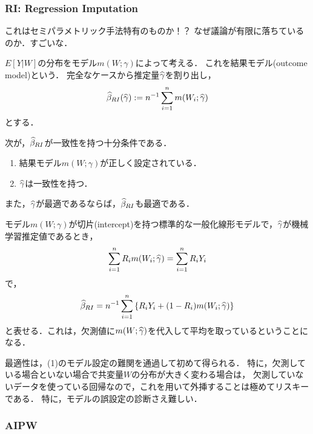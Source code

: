 \documentclass[uplatex,dvipdfmx]{jsreport}
\begin{document}
\subsubsection{RI: Regression Imputation}

\begin{tcolorbox}[colframe=ForestGreen, colback=ForestGreen!10!white,breakable,colbacktitle=ForestGreen!40!white,coltitle=black,fonttitle=\bfseries\sffamily,
title=]
    これはセミパラメトリック手法特有のものか！？
    なぜ議論が有限に落ちているのか．すごいな．
\end{tcolorbox}

$E[Y|W]$の分布をモデル$m(W;\gamma)$によって考える．
これを結果モデル(outcome model)という．
完全なケースから推定量$\widehat{\gamma}$を割り出し，
\[\widehat{\beta}_{RI}(\widehat{\gamma}):=n^{-1}\sum^n_{i=1}m(W_i;\widehat{\gamma})\]
とする．

\begin{theorem}
    次が，$\widehat{\beta}_{RI}$が一致性を持つ十分条件である．
    \begin{enumerate}
        \item 結果モデル$m(W;\gamma)$が正しく設定されている．
        \item $\widehat{\gamma}$は一致性を持つ．
    \end{enumerate}
    また，$\widehat{\gamma}$が最適であるならば，$\widehat{\beta}_{RI}$も最適である．
\end{theorem}

\begin{remark}[本当に回帰代入法になっているのか？]
    モデル$m(W;\gamma)$が切片(intercept)を持つ標準的な一般化線形モデルで，$\widehat{\gamma}$が機械学習推定値であるとき，
    \[\sum^n_{i=1}R_im(W_i;\widehat{\gamma})=\sum^n_{i=1}R_iY_i\]
    で，
    \[\widehat{\beta}_{RI}=n^{-1}\sum^n_{i=1}\left\{R_iY_i+(1-R_i)m(W_i;\widehat{\gamma})\right\}\]
    と表せる．これは，欠測値に$m(W;\widehat{\gamma})$を代入して平均を取っているということになる．
\end{remark}

\begin{remark}
    最適性は，(1)のモデル設定の難関を通過して初めて得られる．
    特に，欠測している場合といない場合で共変量$W$の分布が大きく変わる場合は，
    欠測していないデータを使っている回帰なので，これを用いて外挿することは極めてリスキーである．
    特に，モデルの誤設定の診断さえ難しい．
\end{remark}

\subsubsection{AIPW}
\end{document}
